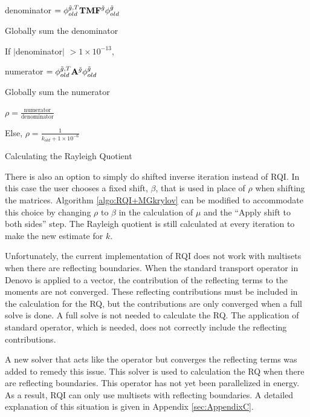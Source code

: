 %
\begin{algorithm}[!h]
  \begin{list}{}{\hspace{2.5em}}
    \item denominator $= \phi_{old}^{\tilde{g}, T} \mathbf{TMF}^{\tilde{g}} \phi_{old}^{\tilde{g}}$
    \item Globally sum the denominator
    \item If $|$denominator$|$ $> 1 \times 10^{-13}$, 
      \begin{list}{}{\hspace{1em}}
        \item numerator  $= \phi_{old}^{\tilde{g}, T} \mathbf{A}^{\tilde{g}} \phi_{old}^{\tilde{g}}$
        \item Globally sum the numerator
        \item $\rho = \frac{\text{numerator}}{\text{denominator}}$
      \end{list}
    \item Else, $\rho = \frac{1}{k_{old} + 1 \times 10^{-6}}$ 
  \end{list}
  \caption{Calculating the Rayleigh Quotient}
  \label{algo:calcRQ}
\end{algorithm}

There is also an option to simply do shifted inverse iteration instead of RQI. In this case the user chooses a fixed shift, $\beta$, that is used in place of $\rho$ when shifting the matrices. Algorithm \ref{algo:RQI+MGkrylov} can be modified to accommodate this choice by changing $\rho$ to $\beta$ in the calculation of $\mu$ and the ``Apply shift to both sides'' step. The Rayleigh quotient is still calculated at every iteration to make the new estimate for $k$. 

Unfortunately, the current implementation of RQI does not work with multisets when there are reflecting boundaries. When the standard transport operator in Denovo is applied to a vector, the contribution of the reflecting terms to the moments are not converged. These reflecting contributions must be included in the calculation for the RQ, but the contributions are only converged when a full solve is done. A full solve is not needed to calculate the RQ. The application of standard operator, which is needed, does not correctly include the reflecting contributions. 

A new solver that acts like the operator but converges the reflecting terms was added to remedy this issue. This solver is used to calculation the RQ when there are reflecting boundaries. This operator has not yet been parallelized in energy. As a result, RQI can only use multisets with reflecting boundaries. A detailed explanation of this situation is given in Appendix \ref{sec:AppendixC}.

